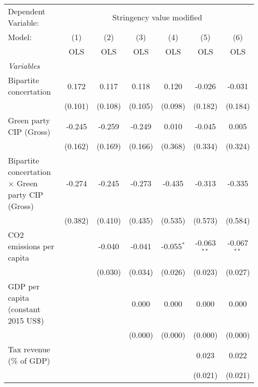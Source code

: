 
\begingroup
\centering
\begin{tabular}{lcccccc}
   \toprule
   Dependent Variable: & \multicolumn{6}{c}{Stringency value modified}\\
   Model:                                                   & (1)     & (2)     & (3)     & (4)          & (5)           & (6)\\  
                                                            &  OLS    & OLS     & OLS     & OLS          & OLS           & OLS\\  
   \midrule
   \emph{Variables}\\
   Bipartite concertation                                   & 0.172   & 0.117   & 0.118   & 0.120        & -0.026        & -0.031\\   
                                                            & (0.101) & (0.108) & (0.105) & (0.098)      & (0.182)       & (0.184)\\   
   Green party CIP (Gross)                                  & -0.245  & -0.259  & -0.249  & 0.010        & -0.045        & 0.005\\   
                                                            & (0.162) & (0.169) & (0.166) & (0.368)      & (0.334)       & (0.324)\\   
   Bipartite concertation $\times$ Green party CIP (Gross)  & -0.274  & -0.245  & -0.273  & -0.435       & -0.313        & -0.335\\   
                                                            & (0.382) & (0.410) & (0.435) & (0.535)      & (0.573)       & (0.584)\\   
   CO2 emissions per capita                                 &         & -0.040  & -0.041  & -0.055$^{*}$ & -0.063$^{**}$ & -0.067$^{**}$\\   
                                                            &         & (0.030) & (0.034) & (0.026)      & (0.023)       & (0.027)\\   
   GDP per capita (constant 2015 US\$)                      &         &         & 0.000   & 0.000        & 0.000         & 0.000\\   
                                                            &         &         & (0.000) & (0.000)      & (0.000)       & (0.000)\\   
   Tax revenue (\% of GDP)                                  &         &         &         &              & 0.023         & 0.022\\   
                                                            &         &         &         &              & (0.021)       & (0.021)\\   

\end{tabular}
